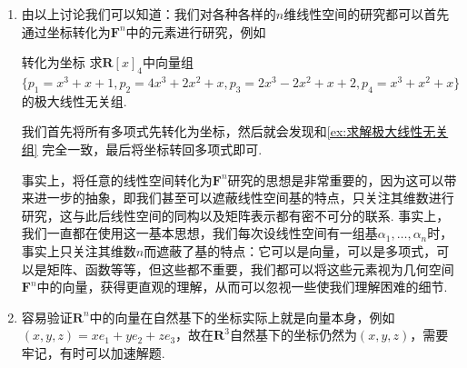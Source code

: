 \begin{enumerate}
\begin{enumerate}
              \item 双射性：即坐标与向量是一一对应的：一个坐标可以确定唯一的向量，一个向量在基下表示的系数（即向量的坐标）也必然唯一（因为基是线性无关的）.
          \end{enumerate}
          由此我们发现，坐标映射$\varphi_B$实际上是一个同构映射，这表明任意一个$n$维线性空间$V(\mathbf{F})$都与$\mathbf{F}^n$同构，这表明任意的线性空间的元素都可以与一个向量空间中的一般向量（即它的坐标）一一对应，并且它们之间的运算也是完全一致的. 因此我们研究任意的$n$维线性空间都可以转化为研究$\mathbf{F}^n$这一非常基本的空间. 这是十分有趣的事情，因为我们当时以抽象公理定义线性空间便是希望将几何上普通向量的性质抽象出来也能应用于其它的集合，现在我们发现任意线性空间都可以视为一个普通几何上的向量组成的线性空间. 于是，这些被公理化纳入线性空间研究范畴的集合，例如多项式、矩阵等，都可以在坐标的视角下视为普通向量组成的线性空间，从而可以更加方便地研究它们的性质.

    \item 由以上讨论我们可以知道：我们对各种各样的$n$维线性空间的研究都可以首先通过坐标转化为$\mathbf{F}^n$中的元素进行研究，例如
          \begin{example}{}{转化为坐标}
              求$\mathbf{R}[x]_4$中向量组$\{p_1=x^3+x+1,p_2=4x^3+2x^2+x,p_3=2x^3-2x^2+x+2,p_4=x^3+x^2+x\}$的极大线性无关组.
          \end{example}
          \begin{solution}
              我们首先将所有多项式先转化为坐标，然后就会发现和\autoref{ex:求解极大线性无关组} 完全一致，最后将坐标转回多项式即可.
          \end{solution}

          事实上，将任意的线性空间转化为$\mathbf{F}^n$研究的思想是非常重要的，因为这可以带来进一步的抽象，即我们甚至可以遮蔽线性空间基的特点，只关注其维数进行研究，这与此后线性空间的同构以及矩阵表示都有密不可分的联系. 事实上，我们一直都在使用这一基本思想，我们每次设线性空间有一组基$\alpha_1,\ldots,\alpha_n$时，事实上只关注其维数$n$而遮蔽了基的特点：它可以是向量，可以是多项式，可以是矩阵、函数等等，但这些都不重要，我们都可以将这些元素视为几何空间$\mathbf{F}^n$中的向量，获得更直观的理解，从而可以忽视一些使我们理解困难的细节.

    \item 容易验证$\mathbf{R}^n$中的向量在自然基下的坐标实际上就是向量本身，例如$(x,y,z)=xe_1+ye_2+ze_3$，故在$\mathbf{R}^3$自然基下的坐标仍然为$(x,y,z)$，需要牢记，有时可以加速解题.
\end{enumerate}


